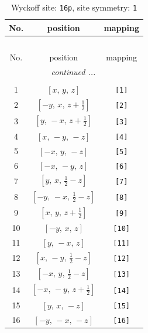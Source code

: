 \documentclass[fleqn,8pt]{jsarticle}
\begin{document}
\begin{longtable}{ccc}
\caption{Wyckoff site: {\tt 16p}, site symmetry: {\tt 1}}
 \\
 \hline \hline
No. & position & mapping \\ \hline \endfirsthead

\multicolumn{2}{l}{\tablename\ \thetable{}} \\
 \hline \hline
No. & position & mapping \\ \hline \endhead

 \hline \hline
\multicolumn{2}{r}{\footnotesize\it continued ...} \\ \endfoot

 \hline \hline
\multicolumn{2}{r}{} \\ \endlastfoot

1 & $\left[ x,\, y,\, z \right]$ & {\tt [1]} \\ \hline
2 & $\left[ - y,\, x,\, z + \frac{1}{2} \right]$ & {\tt [2]} \\ \hline
3 & $\left[ y,\, - x,\, z + \frac{1}{2} \right]$ & {\tt [3]} \\ \hline
4 & $\left[ x,\, - y,\, - z \right]$ & {\tt [4]} \\ \hline
5 & $\left[ - x,\, y,\, - z \right]$ & {\tt [5]} \\ \hline
6 & $\left[ - x,\, - y,\, z \right]$ & {\tt [6]} \\ \hline
7 & $\left[ y,\, x,\, \frac{1}{2} - z \right]$ & {\tt [7]} \\ \hline
8 & $\left[ - y,\, - x,\, \frac{1}{2} - z \right]$ & {\tt [8]} \\ \hline
9 & $\left[ x,\, y,\, z + \frac{1}{2} \right]$ & {\tt [9]} \\ \hline
10 & $\left[ - y,\, x,\, z \right]$ & {\tt [10]} \\ \hline
11 & $\left[ y,\, - x,\, z \right]$ & {\tt [11]} \\ \hline
12 & $\left[ x,\, - y,\, \frac{1}{2} - z \right]$ & {\tt [12]} \\ \hline
13 & $\left[ - x,\, y,\, \frac{1}{2} - z \right]$ & {\tt [13]} \\ \hline
14 & $\left[ - x,\, - y,\, z + \frac{1}{2} \right]$ & {\tt [14]} \\ \hline
15 & $\left[ y,\, x,\, - z \right]$ & {\tt [15]} \\ \hline
16 & $\left[ - y,\, - x,\, - z \right]$ & {\tt [16]} \\
\end{longtable}
\end{document}
